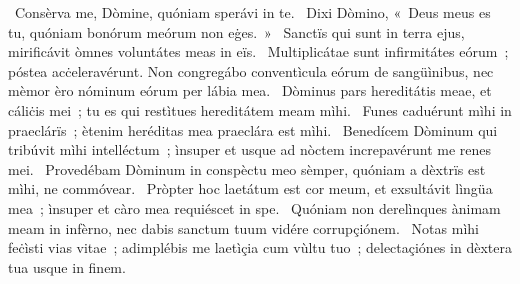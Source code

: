 \psalmChapterWithInscription{}
{ }
{%
~Consèrva me, Dòmine, quóniam sperávi in te. 
~Dixi Dòmino, «~Deus meus es tu, quóniam bonórum meórum non eġes.~»
~Sanctïs qui sunt in terra ejus, mirificávit òmnes voluntátes meas in eïs. 
~Multiplicátae sunt infirmitátes eórum~; póstea acċeleravérunt. Non congregábo conventìcula eórum de sangüìnibus, nec mèmor èro nóminum eórum per lábia mea. 
~Dòminus pars hereditátis meae, et cáliċis mei~; tu es qui restìtues hereditátem meam mìhi. 
~Funes caduérunt mìhi in praeclárïs~; ètenim heréditas mea praeclára est mìhi. 
~Benedícem Dòminum qui tribúvit mìhi intelléctum~; ìnsuper et usque ad nòctem increpavérunt me renes mei. 
~Provedébam Dòminum in conspèctu meo sèmper, quóniam a dèxtrïs est mìhi, ne commóvear. 
~Pròpter hoc laetátum est cor meum, et exsultávit lìngüa mea~; ìnsuper et càro mea requiéscet in spe. 
~Quóniam non derelìnques ànimam meam in infèrno, nec dabis sanctum tuum vidére corrupçiónem. 
~Notas mìhi feċìsti vias vitae~; adimplébis me laetìçia cum vùltu tuo~; delectaçiónes in dèxtera tua usque in finem. 
}
